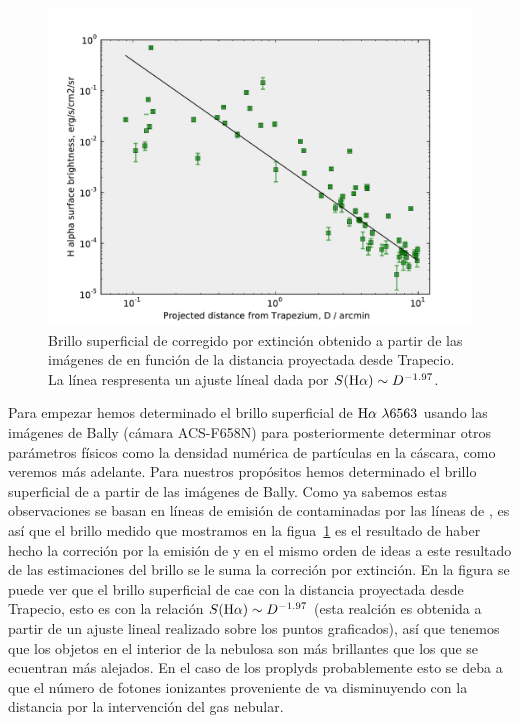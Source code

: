 \begin{figure}
  \centering
   \includegraphics[width=\linewidth, clip]{luis-programas/brightness-shell_acs_Vs-D_new.pdf}
  \caption{Brillo superficial de \ha{}  corregido por extinción obtenido a partir de las imágenes de \citeauthor{Bally:2006a} en función de la distancia proyectada desde Trapecio. La línea respresenta un ajuste líneal dada por \(S(\mathrm{H}\alpha{})\sim D^{-1.97}\).} 
  \label{fig:bright}
\end{figure}


Para empezar hemos determinado el brillo superficial de \(\mathrm{H}\alpha{}~\lambda6563\) usando las imágenes de Bally (cámara ACS-F658N) para posteriormente determinar otros parámetros físicos como la densidad numérica de partículas en la cáscara, como veremos más adelante. Para nuestros propósitos hemos determinado el brillo superficial de \ha{} a partir de las imágenes de Bally. Como ya sabemos estas observaciones se basan en líneas de emisión de \ha{} contaminadas por las líneas de \nii{}, es así que el brillo medido que  mostramos en la figua~\ref{fig:bright} es el resultado de haber hecho la correción por la emisión de \nii y en el mismo orden de ideas a este resultado de las estimaciones del brillo se le suma la correción por extinción. En la figura se puede ver que el brillo superficial  de \ha{} cae con la distancia proyectada desde Trapecio, esto es con la relación \(S(\mathrm{H}\alpha{})\sim D^{-1.97}\) (esta realción es obtenida a partir de un ajuste lineal realizado sobre los  puntos graficados), así que tenemos que los objetos en el interior de la nebulosa son más brillantes que los que se ecuentran más alejados. En el caso de los proplyds probablemente esto se deba a que el número de fotones ionizantes proveniente de \thC{} va disminuyendo con la distancia por la intervención del gas nebular.  

